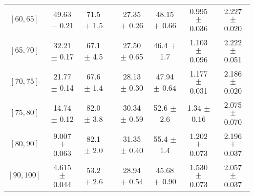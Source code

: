 \begin{tabular}{c||c|c|c|c|c|c|c}
$[60, 65]$ & 49.63 $\pm$ 0.21 & 71.5 $\pm$ 1.5 &  & 27.35 $\pm$ 0.26 & 48.15 $\pm$ 0.66 & 0.995 $\pm$ 0.036 & 2.227 $\pm$ 0.020\\
$[65, 70]$ & 32.21 $\pm$ 0.17 & 67.1 $\pm$ 4.5 &  & 27.50 $\pm$ 0.65 & 46.4 $\pm$ 1.7 & 1.103 $\pm$ 0.096 & 2.222 $\pm$ 0.051\\
$[70, 75]$ & 21.77 $\pm$ 0.14 & 67.6 $\pm$ 1.4 &  & 28.13 $\pm$ 0.30 & 47.94 $\pm$ 0.64 & 1.177 $\pm$ 0.031 & 2.186 $\pm$ 0.020\\
$[75, 80]$ & 14.74 $\pm$ 0.12 & 82.0 $\pm$ 3.8 &  & 30.34 $\pm$ 0.59 & 52.6 $\pm$ 2.6 & 1.34 $\pm$ 0.16 & 2.075 $\pm$ 0.070\\
$[80, 90]$ & 9.007 $\pm$ 0.063 & 82.1 $\pm$ 2.0 &  & 31.35 $\pm$ 0.40 & 55.4 $\pm$ 1.4 & 1.202 $\pm$ 0.073 & 2.196 $\pm$ 0.037\\
$[90, 100]$ & 4.615 $\pm$ 0.044 & 53.2 $\pm$ 2.6 &  & 28.94 $\pm$ 0.54 & 45.68 $\pm$ 0.90 & 1.530 $\pm$ 0.073 & 2.057 $\pm$ 0.037\\
\end{tabular}
